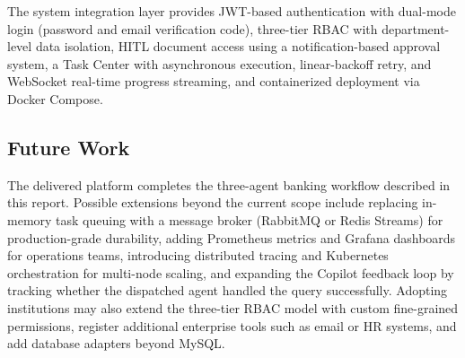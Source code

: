 The system integration layer provides JWT-based authentication with dual-mode login (password and email verification code), three-tier RBAC with department-level data isolation, HITL document access using a notification-based approval system, a Task Center with asynchronous execution, linear-backoff retry, and WebSocket real-time progress streaming, and containerized deployment via Docker Compose.

\subsection{Future Work}

The delivered platform completes the three-agent banking workflow described in this report. Possible extensions beyond the current scope include replacing in-memory task queuing with a message broker (RabbitMQ or Redis Streams) for production-grade durability, adding Prometheus metrics and Grafana dashboards for operations teams, introducing distributed tracing and Kubernetes orchestration for multi-node scaling, and expanding the Copilot feedback loop by tracking whether the dispatched agent handled the query successfully. Adopting institutions may also extend the three-tier RBAC model with custom fine-grained permissions, register additional enterprise tools such as email or HR systems, and add database adapters beyond MySQL.

\newpage

